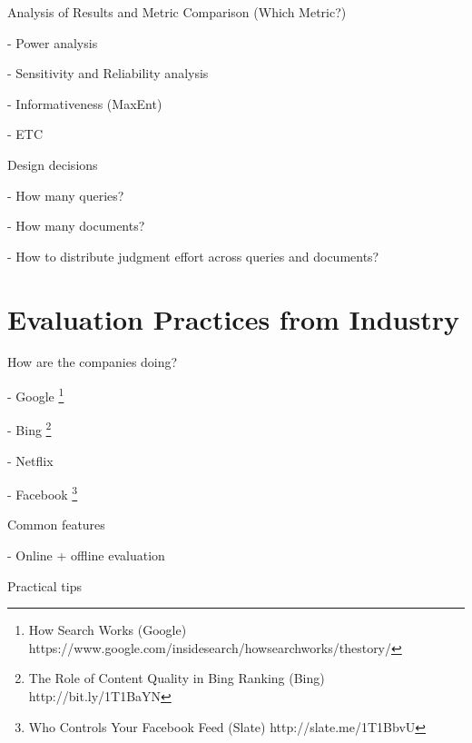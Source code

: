 \documentclass[openany]{now} %
\newcommand{\newpar}{\bigskip\noindent}
\begin{document}
\newpar
Analysis of Results and Metric Comparison (Which Metric?)

- Power analysis \cite{Sakai:2014}

- Sensitivity and Reliability analysis \cite{Urbano:2013} 

- Informativeness (MaxEnt) \cite{AslamYP05}

- ETC \cite{Bron:2013} \cite{Boytsov:2013}  \cite{Robertson:2012}


\newpar
Design decisions

- How many queries? \cite{Sakai:2014}

- How many documents? \cite{CarterettePFK09}

- How to distribute judgment effort across queries and documents? \cite{CarterettePKAA09, YilmazR09}

\chapter{Evaluation Practices from Industry}

How are the companies doing?

-	Google \footnote{How Search Works (Google) https://www.google.com/insidesearch/howsearchworks/thestory/}

-	Bing \footnote{The Role of Content Quality in Bing Ranking (Bing)
	 http://bit.ly/1T1BaYN}

-	Netflix \cite{Gomez-Uribe2015}

-	Facebook \footnote{Who Controls Your Facebook Feed (Slate) http://slate.me/1T1BbvU}

\newpar
Common features

- Online + offline evaluation

\newpar
Practical tips


\backmatter  %



	
\end{document}
